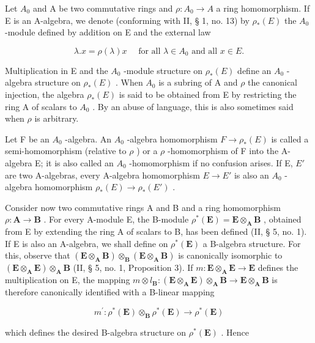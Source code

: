 Let \(A_{0}\) and A be two commutative rings and \(\rho:A_{0}\to A\) a ring homomorphism. If E is an A-algebra, we denote (conforming with II, § 1, no. 13) by \(\rho_{*}(E)\) the \(A_{0}\) -module defined by addition on E and the external law

\[
\lambda . x = \rho (\lambda) x \quad \text { for   all } \lambda \in A _ {0} \text { and   all } x \in E.
\]

Multiplication in E and the \(A_{0}\) -module structure on \(\rho_{*}(E)\) define an \(A_{0}\) -algebra structure on \(\rho_{*}(E)\) . When \(A_{0}\) is a subring of A and \(\rho\) the canonical injection, the algebra \(\rho_{*}(E)\) is said to be obtained from E by restricting the ring A of scalars to \(A_{0}\) . By an abuse of language, this is also sometimes said when \(\rho\) is arbitrary.

Let F be an \(A_{0}\) -algebra. An \(A_{0}\) -algebra homomorphism \(F \to \rho_{*}(E)\) is called a semi-homomorphism (relative to \(\rho\) ) or a \(\rho\) -homomorphism of F into the A-algebra E; it is also called an \(A_{0}\) -homomorphism if no confusion arises. If E, \(E'\) are two A-algebras, every A-algebra homomorphism \(E \to E'\) is also an \(A_{0}\) -algebra homomorphism \(\rho_{*}(E) \to \rho_{*}(E')\) .

Consider now two commutative rings A and B and a ring homomorphism \(\rho: \mathbf{A} \to \mathbf{B}\) . For every A-module E, the B-module \(\rho^{*}(\mathbf{E}) = \mathbf{E} \otimes_{\mathbf{A}} \mathbf{B}\) , obtained from E by extending the ring A of scalars to B, has been defined (II, § 5, no. 1). If E is also an A-algebra, we shall define on \(\rho^{*}(\mathbf{E})\) a B-algebra structure. For this, observe that \((\mathbf{E} \otimes_{\mathbf{A}} \mathbf{B}) \otimes_{\mathbf{B}} (\mathbf{E} \otimes_{\mathbf{A}} \mathbf{B})\) is canonically isomorphic to \((\mathbf{E} \otimes_{\mathbf{A}} \mathbf{E}) \otimes_{\mathbf{A}} \mathbf{B}\) (II, § 5, no. 1, Proposition 3). If \(m: \mathbf{E} \otimes_{\mathbf{A}} \mathbf{E} \to \mathbf{E}\) defines the multiplication on E, the mapping \(m \otimes l_{\mathbf{B}}: (\mathbf{E} \otimes_{\mathbf{A}} \mathbf{E}) \otimes_{\mathbf{A}} \mathbf{B} \to \mathbf{E} \otimes_{\mathbf{A}} \mathbf{B}\) is therefore canonically identified with a B-linear mapping

\[
m ^ {\prime}: \rho^ {*} (\mathbf {E}) \otimes_ {\mathbf {B}} \rho^ {*} (\mathbf {E}) \rightarrow \rho^ {*} (\mathbf {E})
\]

which defines the desired B-algebra structure on \(\rho^{*}(\mathbf{E})\) . Hence

